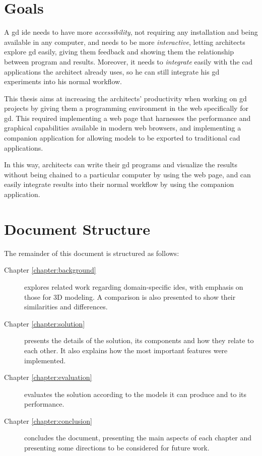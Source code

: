 \section{Goals}
A \gls{gd} \gls{ide} needs to have more \textit{accessibility}, not requiring any installation and being available in any computer, and needs to be more \textit{interactive}, letting architects explore \gls{gd} easily, giving them feedback and showing them the relationship between program and results.
Moreover, it needs to \textit{integrate} easily with the \gls{cad} applications the architect already uses, so he can still integrate his \gls{gd} experiments into his normal workflow.

This thesis aims at increasing the architects' productivity when working on \gls{gd} projects by giving them a programming environment in the web specifically for \gls{gd}.
This required implementing a web page that harnesses the performance and graphical capabilities available in modern web browsers, and implementing a companion application for allowing models to be exported to traditional \gls{cad} applications.

In this way, architects can write their \gls{gd} programs and visualize the results without being chained to a particular computer by using the web page, and can easily integrate results into their normal workflow by using the companion application.


\section{Document Structure}
The remainder of this document is structured as follows:
\begin{description}
  \item[Chapter \ref{chapter:background}] explores related work regarding domain-specific \glspl{ide}, with emphasis on those for 3D modeling. A comparison is also presented to show their similarities and differences.
  \item[Chapter \ref{chapter:solution}] presents the details of the solution, its components and how they relate to each other. It also explains how the most important features were implemented.
  \item[Chapter \ref{chapter:evaluation}] evaluates the solution according to the models it can produce and to its performance.
  \item[Chapter \ref{chapter:conclusion}] concludes the document, presenting the main aspects of each chapter and presenting some directions to be considered for future work.
\end{description}



